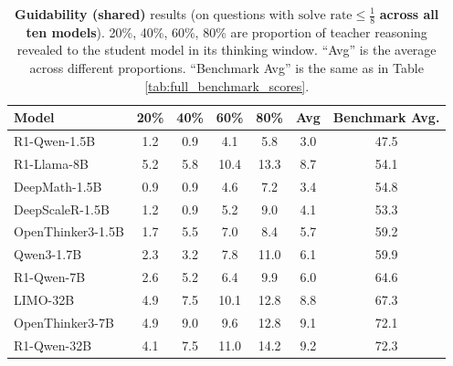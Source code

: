 \documentclass{article} %
\begin{document}
\newpage

\begin{table}[ht!]
  \centering
  \small
  \begin{tabular}{lccccc|c}
    \toprule
    \textbf{Model} & \textbf{20\%} & \textbf{40\%} & \textbf{60\%} & \textbf{80\%} & \textbf{Avg} & \textbf{Benchmark Avg.} \\
    \midrule
    R1-Qwen-1.5B    & 1.2 & 0.9 & 4.1 & 5.8 & 3.0 & 47.5 \\
    R1-Llama-8B     & 5.2 & 5.8 & 10.4 & 13.3 & 8.7 & 54.1 \\
    DeepMath-1.5B           & 0.9 & 0.9 & 4.6 & 7.2 & 3.4 & 54.8 \\
    DeepScaleR-1.5B         & 1.2 & 0.9 & 5.2 & 9.0 & 4.1 & 53.3 \\
    OpenThinker3-1.5B       & 1.7 & 5.5 & 7.0 & 8.4 & 5.7 & 59.2 \\
    Qwen3-1.7B              & 2.3 & 3.2 & 7.8 & 11.0 & 6.1 & 59.9 \\
    \midrule
    R1-Qwen-7B      & 2.6 & 5.2 & 6.4 & 9.9 & 6.0 & 64.6 \\
    LIMO-32B                & 4.9 & 7.5 & 10.1 & 12.8 & 8.8 & 67.3 \\
    OpenThinker3-7B         & 4.9 & 9.0 & 9.6 & 12.8 & 9.1 & 72.1 \\
    R1-Qwen-32B     & 4.1 & 7.5 & 11.0 & 14.2 & 9.2 & 72.3 \\
    \bottomrule
  \end{tabular}
  \caption{\textbf{Guidability (shared)} results (on questions with $\text{solve rate} \leq \tfrac{1}{8}$ \textbf{across all ten models}). 20\%, 40\%, 60\%, 80\% are proportion of teacher reasoning revealed to the student model in its thinking window. ``Avg'' is the average across different proportions. ``Benchmark Avg'' is the same as in Table \ref{tab:full_benchmark_scores}.}
  \label{tab:guidability-shared}
\end{table}
\end{document}
